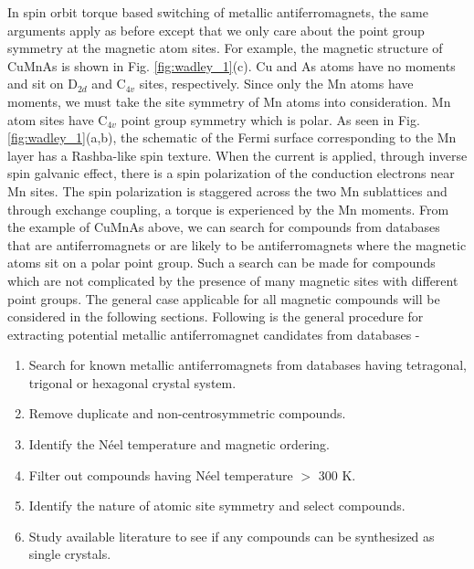 \documentclass[letterpaper,10pt,doublespacing,edeposit]{uiucthesis2020}
\begin{document}
\begin{mainmatter}
In spin orbit torque based switching of metallic antiferromagnets, the same arguments apply as before except that we only care about the point group symmetry at the magnetic atom sites. For example, the magnetic structure of CuMnAs is shown in Fig. \ref{fig:wadley_1}(c). Cu and As atoms have no moments and sit on D$_{2d}$ and C$_{4v}$ sites, respectively. Since only the Mn atoms have moments, we must take the site symmetry of Mn atoms into consideration. Mn atom sites have C$_{4v}$ point group symmetry which is polar. As seen in Fig. \ref{fig:wadley_1}(a,b), the schematic of the Fermi surface corresponding to the Mn layer has a Rashba-like spin texture. When the current is applied, through inverse spin galvanic effect, there is a spin polarization of the conduction electrons near Mn sites. The spin polarization is staggered across the two Mn sublattices and through exchange coupling, a torque is experienced by the Mn moments. From the example of CuMnAs above, we can search for compounds from databases that are antiferromagnets or are likely to be antiferromagnets where the magnetic atoms sit on a polar point group. Such a search can be made for compounds which are not complicated by the presence of many magnetic sites with different point groups. The general case applicable for all magnetic compounds will be considered in the following sections. Following is the general procedure for extracting potential metallic antiferromagnet candidates from databases -

\begin{enumerate}
\item Search for known metallic antiferromagnets from databases having tetragonal, trigonal or hexagonal crystal system.
\item Remove duplicate and non-centrosymmetric compounds.
\item Identify the Néel temperature and magnetic ordering.
\item Filter out compounds having Néel temperature $>$ 300 K.
\item Identify the nature of atomic site symmetry and select compounds.
\item Study available literature to see if any compounds can be synthesized as single crystals.
\end{enumerate}


\end{mainmatter}
\end{document}
